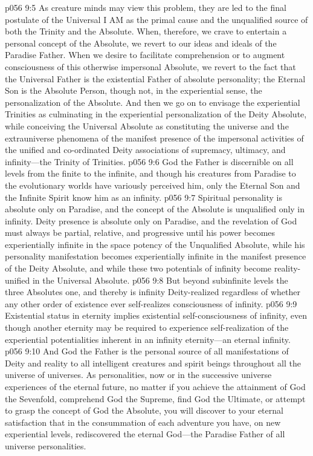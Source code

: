 \vs p056 9:5 As creature minds may view this problem, they are led to the final postulate of the Universal I AM as the primal cause and the unqualified source of both the Trinity and the Absolute. When, therefore, we crave to entertain a personal concept of the Absolute, we revert to our ideas and ideals of the Paradise Father. When we desire to facilitate comprehension or to augment consciousness of this otherwise impersonal Absolute, we revert to the fact that the Universal Father is the existential Father of absolute personality; the Eternal Son is the Absolute Person, though not, in the experiential sense, the personalization of the Absolute. And then we go on to envisage the experiential Trinities as culminating in the experiential personalization of the Deity Absolute, while conceiving the Universal Absolute as constituting the universe and the extrauniverse phenomena of the manifest presence of the impersonal activities of the unified and co\hyp{}ordinated Deity associations of supremacy, ultimacy, and infinity---the Trinity of Trinities.
\pc \vs p056 9:6 God the Father is discernible on all levels from the finite to the infinite, and though his creatures from Paradise to the evolutionary worlds have variously perceived him, only the Eternal Son and the Infinite Spirit know him as an infinity.
\vs p056 9:7 Spiritual personality is absolute only on Paradise, and the concept of the Absolute is unqualified only in infinity. Deity presence is absolute only on Paradise, and the revelation of God must always be partial, relative, and progressive until his power becomes experientially infinite in the space potency of the Unqualified Absolute, while his personality manifestation becomes experientially infinite in the manifest presence of the Deity Absolute, and while these two potentials of infinity become reality\hyp{}unified in the Universal Absolute.
\vs p056 9:8 But beyond subinfinite levels the three Absolutes  one, and thereby is infinity Deity\hyp{}realized regardless of whether any other order of existence ever self\hyp{}realizes consciousness of infinity.
\vs p056 9:9 Existential status in eternity implies existential self\hyp{}consciousness of infinity, even though another eternity may be required to experience self\hyp{}realization of the experiential potentialities inherent in an infinity eternity---an eternal infinity.
\pc \vs p056 9:10 And God the Father is the personal source of all manifestations of Deity and reality to all intelligent creatures and spirit beings throughout all the universe of universes. As personalities, now or in the successive universe experiences of the eternal future, no matter if you achieve the attainment of God the Sevenfold, comprehend God the Supreme, find God the Ultimate, or attempt to grasp the concept of God the Absolute, you will discover to your eternal satisfaction that in the consummation of each adventure you have, on new experiential levels, rediscovered the eternal God---the Paradise Father of all universe personalities.
